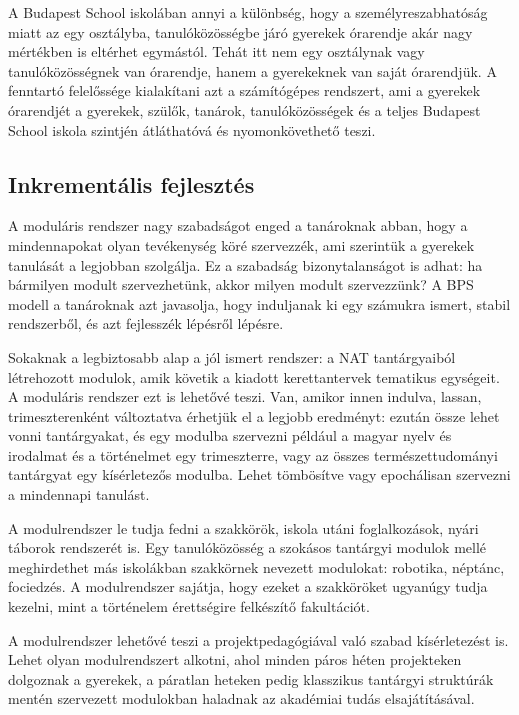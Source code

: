 A Budapest School iskolában annyi a különbség, hogy a
személyreszabhatóság miatt az egy osztályba, tanulóközösségbe járó
gyerekek órarendje akár nagy mértékben is eltérhet egymástól. Tehát itt
nem egy osztálynak vagy tanulóközösségnek van órarendje, hanem a
gyerekeknek van saját órarendjük. A fenntartó felelőssége kialakítani azt
a számítógépes rendszert, ami a gyerekek órarendjét a gyerekek, szülők,
tanárok, tanulóközösségek és a teljes Budapest School iskola szintjén
átláthatóvá és nyomonkövethető teszi.

\hypertarget{inkrementalis-fejlesztes}{%
\subsection{Inkrementális fejlesztés}\label{inkrementalis-fejlesztes}}

A moduláris rendszer nagy szabadságot enged a tanároknak abban, hogy a
mindennapokat olyan tevékenység köré szervezzék, ami szerintük a
gyerekek tanulását a legjobban szolgálja. Ez a szabadság
bizonytalanságot is adhat: ha bármilyen modult szervezhetünk, akkor
milyen modult szervezzünk? A BPS modell a tanároknak azt javasolja, hogy
induljanak ki egy számukra ismert, stabil rendszerből, és azt fejlesszék
lépésről lépésre.

Sokaknak a legbiztosabb alap a jól ismert rendszer: a NAT tantárgyaiból
létrehozott modulok, amik követik a kiadott kerettantervek tematikus
egységeit. A moduláris rendszer ezt is lehetővé teszi. Van, amikor innen
indulva, lassan, trimeszterenként változtatva érhetjük el a legjobb
eredményt: ezután össze lehet vonni tantárgyakat, és egy modulba
szervezni például a magyar nyelv és irodalmat és a történelmet egy
trimeszterre, vagy az összes természettudományi tantárgyat egy
kísérletezős modulba. Lehet tömbösítve vagy epochálisan szervezni a
mindennapi tanulást.

A modulrendszer le tudja fedni a szakkörök, iskola utáni foglalkozások,
nyári táborok rendszerét is. Egy tanulóközösség a szokásos tantárgyi
modulok mellé meghirdethet más iskolákban szakkörnek nevezett modulokat:
robotika, néptánc, fociedzés. A modulrendszer sajátja, hogy ezeket a
szakköröket ugyanúgy tudja kezelni, mint a történelem érettségire
felkészítő fakultációt.

A modulrendszer lehetővé teszi a projektpedagógiával való szabad
kísérletezést is. Lehet olyan modulrendszert alkotni, ahol minden páros
héten projekteken dolgoznak a gyerekek, a páratlan heteken pedig
klasszikus tantárgyi struktúrák mentén szervezett modulokban haladnak az
akadémiai tudás elsajátításával.

